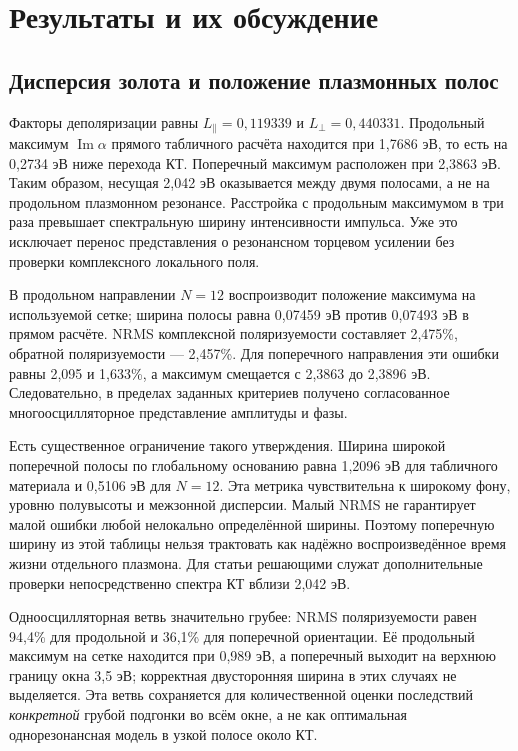 \section{Результаты и их обсуждение}
\subsection{Дисперсия золота и положение плазмонных полос}
Факторы деполяризации равны $L_\parallel=0{,}119339$ и
$L_\perp=0{,}440331$. Продольный максимум
$\operatorname{Im}\alpha$ прямого табличного расчёта находится при
1,7686 эВ, то есть на 0,2734 эВ ниже перехода КТ. Поперечный максимум
расположен при 2,3863 эВ. Таким образом, несущая 2,042 эВ оказывается
между двумя полосами, а не на продольном плазмонном резонансе.
Расстройка с продольным максимумом в три раза превышает спектральную
ширину интенсивности импульса. Уже это исключает перенос представления
о резонансном торцевом усилении без проверки комплексного локального поля.


В продольном направлении $N=12$ воспроизводит положение максимума
на используемой сетке; ширина полосы равна 0,07459 эВ против
0,07493 эВ в прямом расчёте. NRMS комплексной поляризуемости составляет
2,475\%, обратной поляризуемости --- 2,457\%. Для поперечного
направления эти ошибки равны 2,095 и 1,633\%, а максимум смещается
с 2,3863 до 2,3896 эВ. Следовательно, в пределах заданных критериев
получено согласованное многоосцилляторное представление амплитуды и фазы.

Есть существенное ограничение такого утверждения. Ширина широкой
поперечной полосы по глобальному основанию равна 1,2096 эВ для
табличного материала и 0,5106 эВ для $N=12$. Эта метрика чувствительна
к широкому фону, уровню полувысоты и межзонной дисперсии. Малый NRMS
не гарантирует малой ошибки любой нелокально определённой ширины.
Поэтому поперечную ширину из этой таблицы нельзя трактовать как
надёжно воспроизведённое время жизни отдельного плазмона. Для статьи
решающими служат дополнительные проверки непосредственно спектра КТ
вблизи 2,042 эВ.

Одноосцилляторная ветвь значительно грубее: NRMS поляризуемости равен
94,4\% для продольной и 36,1\% для поперечной ориентации.
Её продольный максимум на сетке находится при 0,989 эВ, а поперечный
выходит на верхнюю границу окна 3,5 эВ; корректная двусторонняя ширина
в этих случаях не выделяется. Эта ветвь сохраняется для количественной
оценки последствий \emph{конкретной} грубой подгонки во всём окне,
а не как оптимальная однорезонансная модель в узкой полосе около КТ.

